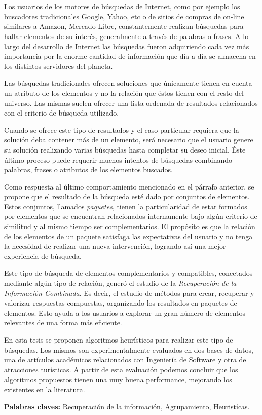 \chapter*{\runtitulo}

\noindent 

Los usuarios de los motores de búsquedas de Internet, como por ejemplo los buscadores tradicionales Google, Yahoo, etc o de sitios de compras de on-line similares a Amazon, Mercado Libre, constantemente realizan búsquedas para hallar elementos de su interés, generalmente a través de palabras o frases. A lo largo del desarrollo de Internet las búsquedas fueron adquiriendo cada vez más importancia por la enorme cantidad de información que día a día se almacena en los distintos servidores del planeta.

Las búsquedas tradicionales ofrecen soluciones que únicamente tienen en cuenta un atributo de los elementos y no la relación que éstos tienen con el resto del universo. Las mismas suelen ofrecer una lista ordenada de resultados relacionados con el criterio de búsqueda utilizado. 

Cuando se ofrece este tipo de resultados y el caso particular requiera que la solución deba contener más de un elemento, será necesario que el usuario genere su solución realizando varias búsquedas hasta completar su deseo inicial. Éste último proceso puede requerir muchos intentos de búsquedas combinando palabras, frases o atributos de los elementos buscados.

Como respuesta al último comportamiento mencionado en el párrafo anterior, se propone que el resultado de la búsqueda esté dado por conjuntos de elementos. Estos conjuntos, llamados {\em paquetes}, tienen la particularidad de estar formados por elementos que se encuentran relacionados internamente bajo algún criterio de similitud y al mismo tiempo ser complementarios. El propósito es que la relación de los elementos de un paquete satisfaga las expectativas del usuario y no tenga la necesidad de realizar una nueva intervención, logrando así una mejor experiencia de búsqueda.

Este tipo de búsqueda de elementos complementarios y compatibles, conectados mediante algún tipo de relación, generó el estudio de la {\em Recuperación de la Información Combinada}. Es decir, el estudio de métodos para crear, recuperar y valorizar respuestas compuestas, organizando los resultados en paquetes de elementos. Esto ayuda a los usuarios a explorar un gran número de elementos relevantes de una forma más eficiente.

En esta tesis se proponen algoritmos heurísticos para realizar este tipo de búsquedas. Los mismos son experimentalmente evaluados en dos bases de datos, una de artículos académicos relacionados con Ingeniería de Software y otra de atracciones turísticas. A partir de esta evaluación podemos concluir que los algoritmos propuestos tienen una muy buena performance, mejorando los existentes en la literatura.
\bigskip


\noindent\textbf{Palabras claves:} Recuperación de la información, Agrupamiento, Heuristícas.